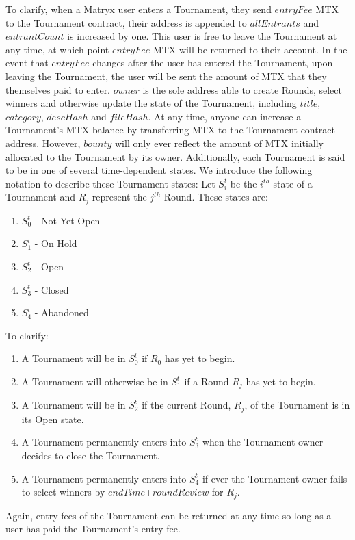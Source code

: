 \documentclass[a4paper, 10pt, conference]{ieeeconf}      %
\begin{document}
To clarify, when a Matryx user enters a Tournament, they send $entryFee$ MTX to the Tournament contract, their address is appended to $allEntrants$ and $entrantCount$ is increased by one. This user is free to leave the Tournament at any time, at which point $entryFee$ MTX will be returned to their account. In the event that $entryFee$ changes after the user has entered the Tournament, upon leaving the Tournament, the user will be sent the amount of MTX that they themselves paid to enter. $owner$ is the sole address able to create Rounds, select winners and otherwise update the state of the Tournament, including $title$, $category$, $descHash$ and $fileHash$. At any time, anyone can increase a Tournament's MTX balance by transferring MTX to the Tournament contract address. However, $bounty$ will only ever reflect the amount of MTX initially allocated to the Tournament by its owner. Additionally, each Tournament is said to be in one of several time-dependent states. We introduce the following notation to describe these Tournament states: Let $S_i^t$ be the $i^{th}$ state of a Tournament and $R_j$ represent the $j^{th}$ Round. These states are:

\begin{enumerate}
\item $S_{0}^t$ - Not Yet Open
\item $S_{1}^t$ - On Hold
\item $S_{2}^t$ - Open
\item $S_{3}^t$ - Closed
\item $S_{4}^t$ - Abandoned
\end{enumerate}
\bigskip


To clarify: 

\begin{enumerate}
\item A Tournament will be in $S_{0}^t$ if $R_0$ has yet to begin.
\item A Tournament will otherwise be in $S_{1}^t$ if a Round $R_j$ has yet to begin.
\item A Tournament will be in $S_{2}^t$ if the current Round, $R_j$, of the Tournament is in its Open state.
\item A Tournament permanently enters into $S_{3}^t$ when the Tournament owner decides to close the Tournament.
\item A Tournament permanently enters into $S_{4}^t$ if ever the Tournament owner fails to select winners by $endTime$+$roundReview$ for $R_j$.
\end{enumerate}
Again, entry fees of the Tournament can be returned at any time so long as a user has paid the Tournament's entry fee.
\end{document}
